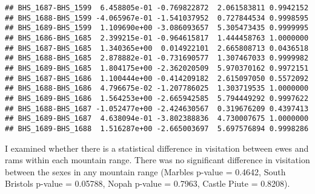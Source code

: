 \documentclass[]{article}
\newenvironment{Shaded}{\begin{snugshade}}{\end{snugshade}}
\newcommand{\CommentTok}[1]{\textcolor[rgb]{0.56,0.35,0.01}{\textit{#1}}}
\begin{document}
\begin{verbatim}
## BHS_1687-BHS_1599  6.458805e-01 -0.769822872  2.061583811 0.9942152
## BHS_1688-BHS_1599 -4.065967e-01 -1.541037952  0.727844534 0.9998595
## BHS_1689-BHS_1599  1.109690e+00 -3.086093657  5.305473435 0.9999995
## BHS_1686-BHS_1685  2.399215e-01 -0.964615817  1.444458763 1.0000000
## BHS_1687-BHS_1685  1.340365e+00  0.014922101  2.665808713 0.0436518
## BHS_1688-BHS_1685  2.878882e-01 -0.731690577  1.307467033 0.9999982
## BHS_1689-BHS_1685  1.804175e+00 -2.362020509  5.970370162 0.9972151
## BHS_1687-BHS_1686  1.100444e+00 -0.414209182  2.615097050 0.5572092
## BHS_1688-BHS_1686  4.796675e-02 -1.207786025  1.303719535 1.0000000
## BHS_1689-BHS_1686  1.564253e+00 -2.665942585  5.794449292 0.9997622
## BHS_1688-BHS_1687 -1.052477e+00 -2.424630567  0.319676209 0.4397413
## BHS_1689-BHS_1687  4.638094e-01 -3.802388836  4.730007675 1.0000000
## BHS_1689-BHS_1688  1.516287e+00 -2.665003697  5.697576894 0.9998286
\end{verbatim}

\begin{Shaded}
\end{Shaded}

I examined whether there is a statistical difference in visitation
between ewes and rams within each mountain range. There was no
significant difference in visitation between the sexes in any mountain
range (Marbles p-value = 0.4642, South Bristols p-value = 0.05788, Nopah
p-value = 0.7963, Castle Piute = 0.8208).
\end{document}
